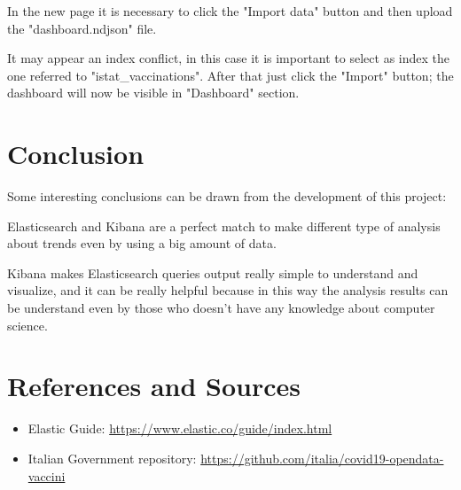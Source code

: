 \documentclass{article}
\begin{document}
In the new page it is necessary to click the {\selectfont"Import data"} button and then upload the {\selectfont"dashboard.ndjson"} file. 

It may appear an index conflict, in this case it is important to select as index the one referred to {\selectfont"istat\_vaccinations"}.
After that just click the {\selectfont"Import"} button; the dashboard will now be visible in {\selectfont"Dashboard"} section.

\newpage

\section{Conclusion}

Some interesting conclusions can be drawn from the development of this project:

Elasticsearch and Kibana are a perfect match to make different type of analysis about trends even by using a big amount of data.

Kibana makes Elasticsearch queries output really simple to understand and visualize, and it can be really helpful because in this way the analysis results can be understand even by those who doesn't have any knowledge about computer science.

\section{References and Sources}
\begin{itemize}
    \item Elastic Guide: \url{https://www.elastic.co/guide/index.html}
    \item Italian Government repository: \url{https://github.com/italia/covid19-opendata-vaccini}
    
\end{itemize}
\end{document}
